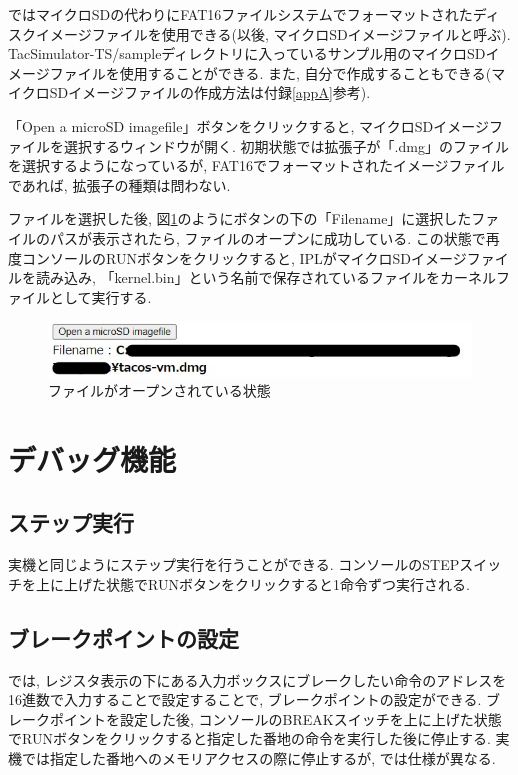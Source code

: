 \tacsim ではマイクロSDの代わりにFAT16ファイルシステムでフォーマットされたディスクイメージファイルを使用できる(以後, マイクロSDイメージファイルと呼ぶ). TacSimulator-TS/sampleディレクトリに入っているサンプル用のマイクロSDイメージファイルを使用することができる. また, 自分で作成することもできる(マイクロSDイメージファイルの作成方法は付録\ref{appA}参考).

「Open a microSD imagefile」ボタンをクリックすると, マイクロSDイメージファイルを選択するウィンドウが開く. 初期状態では拡張子が「.dmg」のファイルを選択するようになっているが, FAT16でフォーマットされたイメージファイルであれば, 拡張子の種類は問わない.

ファイルを選択した後, 図\ref{fig:ch3-filepath}のようにボタンの下の「Filename」に選択したファイルのパスが表示されたら, ファイルのオープンに成功している. この状態で再度コンソールのRUNボタンをクリックすると, IPLがマイクロSDイメージファイルを読み込み, 「kernel.bin」という名前で保存されているファイルをカーネルファイルとして実行する.

\begin{figure}[H]
    \centering
    \includegraphics[width=12cm]{"figs/chapter3-filepath.jpg"}
    \caption{ファイルがオープンされている状態} \label{fig:ch3-filepath}
\end{figure}


\section{デバッグ機能}

\subsection{ステップ実行}
実機と同じようにステップ実行を行うことができる. コンソールのSTEPスイッチを上に上げた状態でRUNボタンをクリックすると1命令ずつ実行される.

\subsection{ブレークポイントの設定}
\tacsim では, レジスタ表示の下にある入力ボックスにブレークしたい命令のアドレスを16進数で入力することで設定することで, ブレークポイントの設定ができる. 
ブレークポイントを設定した後, コンソールのBREAKスイッチを上に上げた状態でRUNボタンをクリックすると指定した番地の命令を実行した後に停止する. 実機では指定した番地へのメモリアクセスの際に停止するが, \tacsim では仕様が異なる.

